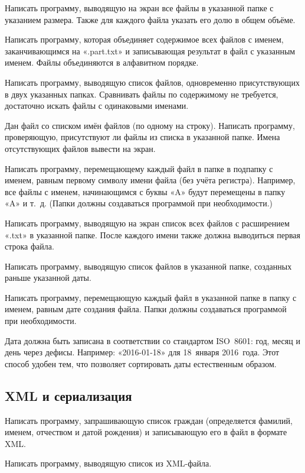 \task Написать программу, выводящую на экран все файлы в указанной
папке с указанием размера. Также для каждого файла указать его долю в
общем объёме.

\task Написать программу, которая объединяет содержимое всех файлов с
именем, заканчивающимся на «.part.txt» и записывающая результат в файл
с указанным именем. Файлы объединяются в алфавитном порядке.

\task Написать программу, выводящую список файлов, одновременно
присутствующих в двух указанных папках. Сравнивать файлы по
содержимому не требуется, достаточно искать файлы с одинаковыми
именами.

\task Дан файл со списком имён файлов (по одному на строку). Написать
программу, проверяющую, присутствуют ли файлы из списка в указанной
папке. Имена отсутствующих файлов вывести на экран.

\task Написать программу, перемещающему каждый файл в папке в подпапку
с именем, равным первому символу имени файла (без учёта
регистра). Например, все файлы с именем, начинающимся с буквы «A»
будут перемещены в папку «A» и т.~д. (Папки должны создаваться
программой при необходимости.)

\task Написать программу, выводящую на экран список всех файлов с
расширением «.txt» в указанной папке. После каждого имени также должна
выводиться первая строка файла.

\task Написать программу, выводящую список файлов в указанной папке,
созданных раньше указанной даты.

\task Написать программу, перемещающую каждый файл в указанной папке в
папку с именем, равным дате создания файла. Папки должны создаваться
программой при необходимости.

Дата должна быть записана в соответствии со стандартом
ISO~8601: год, месяц и день через
дефисы. Например: «2016-01-18» для 18~января 2016~года. Этот способ
удобен тем, что позволяет сортировать даты естественным образом.


\subsection{XML и сериализация}

\task Написать программу, запрашивающую список граждан (определяется
фамилий, именем, отчеством и датой рождения) и записывающую его в
файл в формате XML.

Написать программу, выводящую список из XML-файла.

